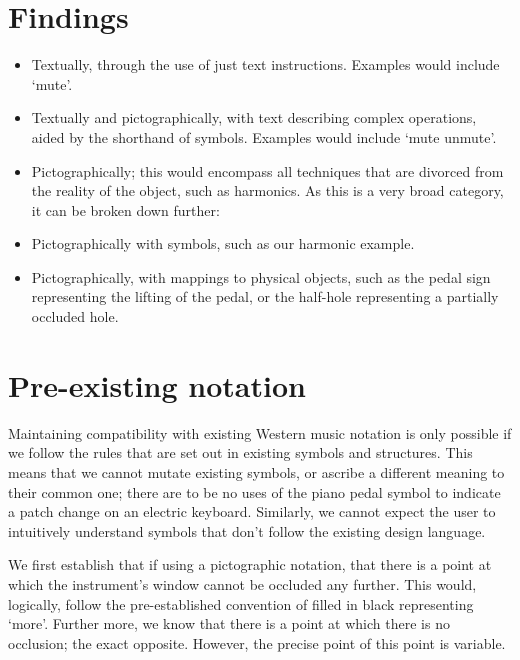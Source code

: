 \section{Findings}


\begin{itemize}
    \item Textually, through the use of just text instructions. 
    Examples would include `mute'.
    \item Textually and pictographically, with text describing complex operations, aided by the shorthand of symbols. 
    Examples would include `mute unmute'.
	\item Pictographically; this would encompass all techniques that are divorced from the reality of the object, such as harmonics. 
    As this is a very broad category, it can be broken down further:
		\item Pictographically with symbols, such as our harmonic example.
		\item Pictographically, with mappings to physical objects, such as the pedal sign representing the lifting of the pedal, or the half-hole representing a partially occluded hole.
\end{itemize}

\section{Pre-existing notation}

Maintaining compatibility with existing Western music notation is only possible if we follow the rules that are set out in existing symbols and structures.
This means that we cannot mutate existing symbols, or ascribe a different meaning to their common one; 
there are to be no uses of the piano pedal symbol to indicate a patch change on an electric keyboard.
Similarly, we cannot expect the user to intuitively understand symbols that don't follow the existing design language.

We first establish that if using a pictographic notation, that there is a point at which the instrument's window cannot be occluded any further. 
This would, logically, follow the pre-established convention of filled in black representing `more'. 
Further more, we know that there is a point at which there is no occlusion; the exact opposite. 
However, the precise point of this point is variable.

